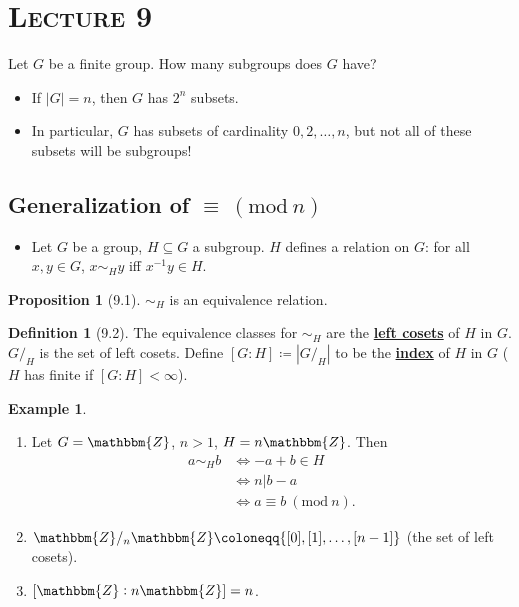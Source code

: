 \documentclass{article}
\newcommand{\Z}{\mathbbm{Z}}
\newcommand{\coleq}{\coloneqq}
\newcommand{\inverse}[1]{#1^{-1}}
\newcommand{\define}[1]{\textbf{\underline{#1}}}
\renewcommand{\mod}[1]{\ (\mathrm{mod}\ #1)}
\theoremstyle{definition}
\newtheorem*{defn}{Definition}
\newtheorem*{prop}{Proposition}
\newtheorem*{ex}{Example}
\theoremstyle{remark}
\begin{document}
    \section*{\textbf{\textsc{Lecture 9}}}{
        Let $G$ be a finite group. How many subgroups does $G$ have?
        \begin{itemize}
            \item If $|G|=n$, then $G$ has $2^n$ subsets.
            \item In particular, $G$ has subsets of cardinality $0,2,\ldots,n$, but not all of these subsets will be subgroups!
        \end{itemize}
        \subsection*{Generalization of $\equiv\mod n$}{
            \begin{itemize}
                \item Let $G$ be a group, $H \subseteq G$ a subgroup. $H$ defines a relation on $G$: for all $x,y \in G$, $x \sim_H y$ iff $\inverse{x}y \in H$.
            \end{itemize}
        
            \begin{prop}[9.1]
                $\sim_H$ is an equivalence relation.
            \end{prop}
            
            \begin{defn}[9.2]\hfill
                The equivalence classes for $\sim_H$ are the \define{left cosets} of $H$ in $G$. $G/_H$ is the set of left cosets. Define $[G:H] \coleq |G/_H|$ to be the \define{index} of $H$ in $G$ ($H$ has finite if $[G:H]< \infty$).
            \end{defn}
            
            \begin{ex}\hfill
                \begin{enumerate}
                    \item Let $G=\Z$, $n>1$, $H=n\Z$. Then
                \begin{align*}
                    a \sim_H b &\iff-a+b \in H\\
                    &\iff n|b-a\\
                    &\iff a \equiv b\mod n.
                \end{align*}
                    \item $\Z/_n\Z \coleq \{[0],[1],\ldots,[n-1]\}$ (the set of left cosets).
                    \item $[\Z:n\Z]=n$.
                \end{enumerate}
            \end{ex}
            
}}
\end{document}
